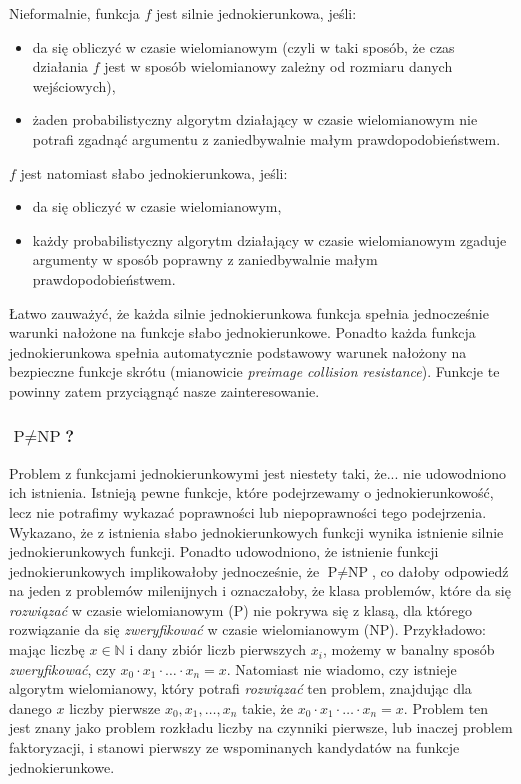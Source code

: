 \documentclass[12pt,a4paper,twoside]{article}
\begin{document}
\noindent
Nieformalnie, funkcja $f$ jest silnie jednokierunkowa, jeśli:
\begin{itemize}
\item da się obliczyć w czasie wielomianowym (czyli w taki sposób, że czas
działania $f$ jest w sposób wielomianowy zależny od rozmiaru danych
wejściowych),
\item żaden probabilistyczny algorytm działający w czasie wielomianowym nie
potrafi zgadnąć argumentu z zaniedbywalnie małym prawdopodobieństwem.
\end{itemize}

\noindent
$f$ jest natomiast słabo jednokierunkowa, jeśli:
\begin{itemize}
\item da się obliczyć w czasie wielomianowym,
\item każdy probabilistyczny algorytm działający w czasie wielomianowym zgaduje
argumenty w sposób poprawny z zaniedbywalnie małym prawdopodobieństwem.
\end{itemize}

Łatwo zauważyć, że każda silnie jednokierunkowa funkcja spełnia jednocześnie
warunki nałożone na funkcje słabo jednokierunkowe. Ponadto każda funkcja
jednokierunkowa spełnia automatycznie podstawowy warunek nałożony na bezpieczne
funkcje skrótu (mianowicie \textit{preimage collision resistance}). Funkcje te
powinny zatem przyciągnąć nasze zainteresowanie.

\subsubsection{$\textrm{P} \neq \textrm{NP}$?}
Problem z funkcjami jednokierunkowymi jest niestety taki, że... nie udowodniono
ich istnienia. Istnieją pewne funkcje, które podejrzewamy o jednokierunkowość,
lecz nie potrafimy wykazać poprawności lub niepoprawności tego podejrzenia.
Wykazano, że z istnienia słabo jednokierunkowych funkcji wynika istnienie
silnie jednokierunkowych funkcji. Ponadto udowodniono, że istnienie funkcji
jednokierunkowych implikowałoby jednocześnie, że $\textrm{P} \neq \textrm{NP}$,
co dałoby odpowiedź na jeden z problemów milenijnych i oznaczałoby, że klasa
problemów, które da się \emph{rozwiązać} w czasie wielomianowym ($\textrm{P}$)
nie pokrywa się z klasą, dla którego rozwiązanie da się \emph{zweryfikować} w
czasie wielomianowym ($\textrm{NP}$). Przykładowo: mając liczbę $x \in
\mathbb{N}$ i dany zbiór liczb pierwszych $x_i$, możemy w banalny sposób
\emph{zweryfikować}, czy $x_0 \cdot x_1 \cdot \ldots \cdot x_n = x$. Natomiast
nie wiadomo, czy istnieje algorytm wielomianowy, który potrafi \emph{rozwiązać}
ten problem, znajdując dla danego $x$ liczby pierwsze $x_0, x_1, \ldots, x_n$
takie, że $x_0 \cdot x_1 \cdot \ldots \cdot x_n = x$. Problem ten jest znany
jako problem rozkładu liczby na czynniki pierwsze, lub inaczej problem
faktoryzacji, i stanowi pierwszy ze wspominanych kandydatów na funkcje
jednokierunkowe.
\end{document}
